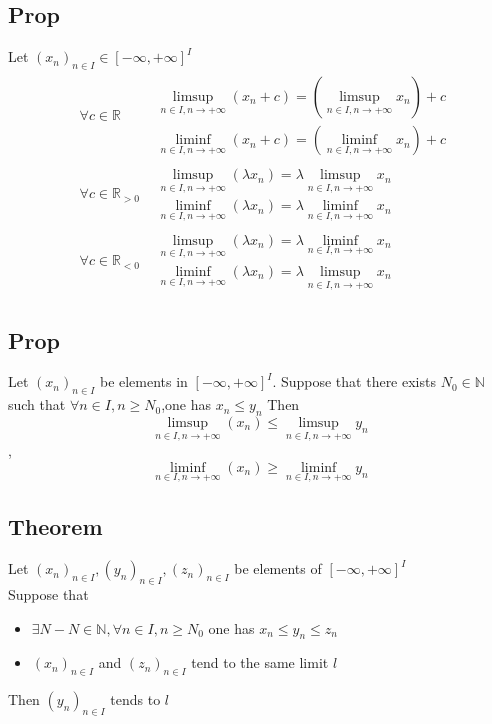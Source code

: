 \documentclass{book}
\begin{document}
\subsection{Prop}
Let $(x_n)_{n\in I}\in[-\infty,+\infty]^I$
\begin{align*}
    &\forall c\in\mathbb{R} & \begin{aligned}
        \limsup\limits_{n\in I,n\rightarrow+\infty}(x_n+c)=(\limsup\limits_{n\in I,n\rightarrow+\infty}x_n)+c\\
        \liminf\limits_{n\in I,n\rightarrow+\infty}(x_n+c)=(\liminf\limits_{n\in I,n\rightarrow+\infty}x_n)+c
    \end{aligned}\\
    &\forall c\in \mathbb{R}_{>0} &\begin{aligned}
        \limsup\limits_{n\in I,n\rightarrow+\infty}(\lambda x_n)=\lambda\limsup\limits_{n\in I,n\rightarrow+\infty}x_n\\\liminf\limits_{n\in I,n\rightarrow+\infty}(\lambda x_n)=\lambda\liminf\limits_{n\in I,n\rightarrow+\infty}x_n
    \end{aligned}\\
    &\forall c\in \mathbb{R}_{<0} &\begin{aligned}
        \limsup\limits_{n\in I,n\rightarrow+\infty}(\lambda x_n)=\lambda\liminf\limits_{n\in I,n\rightarrow+\infty}x_n\\\liminf\limits_{n\in I,n\rightarrow+\infty}(\lambda x_n)=\lambda\limsup\limits_{n\in I,n\rightarrow+\infty}x_n
    \end{aligned}
\end{align*}
\subsection{Prop}
Let $(x_n)_{n\in I}$ be elements in $[-\infty,+\infty]^I$. Suppose that there exists $N_0\in \mathbb{N}$ such that $\forall n\in I,n\geq N_0$,one has $x_n\leq y_n$ Then $$\limsup\limits_{n\in I,n\rightarrow+\infty}(x_n)\leq\limsup\limits_{n\in I,n\rightarrow+\infty}y_n$$ ,$$\liminf\limits_{n\in I,n\rightarrow+\infty}(x_n)\geq\liminf\limits_{n\in I,n\rightarrow+\infty}y_n$$
\subsection{Theorem}
Let $(x_n)_{n\in I},(y_n)_{n\in I},(z_n)_{n\in I}$ be elements of $[-\infty,+\infty]^I$\\
Suppose that \begin{itemize}
    \item $\exists N-N\in\mathbb{N},\forall n\in I,n\geq N_0$ one has $x_n\leq y_n\leq z_n$
    \item $(x_n)_{n\in I}$ and $(z_n)_{n\in I}$ tend to the same limit $l$
\end{itemize}
Then $(y_n)_{n\in I}$ tends to $l$
\end{document}

